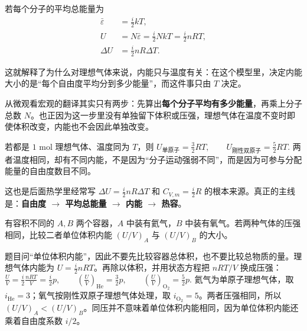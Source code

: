 \documentclass[lang=cn,11pt]{elegantbook}
\newcommand{\bridge}[1]{\begin{note}#1\end{note}}
\begin{document}
若每个分子的平均总能量为
\[
\begin{aligned}
\bar\varepsilon&=\frac{i}{2}kT,\\
U&=N\bar\varepsilon=\frac{i}{2}NkT=\frac{i}{2}nRT,\\
\Delta U&=\frac{i}{2}nR\Delta T.
\end{aligned}
\]

这就解释了为什么对理想气体来说，内能只与温度有关：在这个模型里，决定内能大小的是“每个自由度平均分到多少能量”，而这件事只由 \(T\) 决定。

\bridge{从微观看宏观的翻译其实只有两步：先算出\textbf{每个分子平均有多少能量}，再乘上分子总数 \(N\)。也正因为这一步里没有单独留下体积或压强，理想气体在温度不变时即使体积改变，内能也不会因此单独改变。}

\begin{exercise}[单原子和双原子理想气体的内能为什么不同]
若都是 \(1\) mol 理想气体、温度同为 \(T\)，则
 \(U_{\text{单原子}}=\frac{3}{2}RT,\qquad U_{\text{刚性双原子}}=\frac{5}{2}RT.\) 
两者温度相同，却有不同内能，不是因为“分子运动强弱不同”，而是因为可参与分配能量的自由度数目不同。
\end{exercise}

\begin{remark}
这也是后面热学里经常写 \(\Delta U=\frac{i}{2}nR\Delta T\) 和 \(C_{V,m}=\frac{i}{2}R\) 的根本来源。真正的主线是：\textbf{自由度 \(\rightarrow\) 平均总能量 \(\rightarrow\) 内能 \(\rightarrow\) 热容}。
\end{remark}

\begin{exercise}
有容积不同的 \(A,B\) 两个容器，\(A\) 中装有氦气，\(B\) 中装有氧气。若两种气体的压强相同，比较二者单位体积内能 \((U/V)_A\) 与 \((U/V)_B\) 的大小。
\end{exercise}

\begin{solution}
题目问“单位体积内能”，因此不要先比较容器总体积，也不要比较总物质的量。理想气体内能为
\(U=\frac{i}{2}nRT\)。再除以体积，并用状态方程把 \(nRT/V\) 换成压强：
 \(\frac{U}{V}=\frac{i}{2}\frac{nRT}{V}=\frac{i}{2}p,\qquad \left(\frac{U}{V}\right)_{\mathrm{He}}=\frac32p,\qquad \left(\frac{U}{V}\right)_{\mathrm{O_2}}=\frac52p.\) 
氦气为单原子理想气体，取 \(i_{\mathrm{He}}=3\)；氧气按刚性双原子理想气体处理，取 \(i_{\mathrm{O_2}}=5\)。两者压强相同，所以 \((U/V)_A<(U/V)_B\)。同压并不意味着单位体积内能相同，因为单位体积内能还乘着自由度系数 \(i/2\)。
\end{solution}
\end{document}
